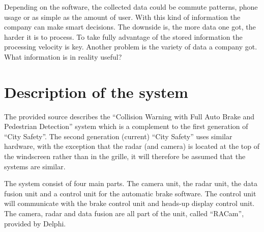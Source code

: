\documentclass[conference]{IEEEtran}
\begin{document}
Depending on the software, the collected data could be commute patterns, phone usage or as simple as the amount of user. With this kind of information the company can make smart decisions. The downside is, the more data one got, the harder it is to process. To take fully advantage of the stored information the processing velocity is key. Another problem is the variety of data a company got. What information is in reality useful? \cite{SpeedDataEco} %


\section{Description of the system}
The provided source describes the ``Collision Warning with Full Auto Brake and Pedestrian Detection'' system which is a complement to the first generation of ``City Safety''. The second generation (current) ``City Safety'' uses similar hardware, with the exception that the radar (and camera) is located at the top of the windscreen rather than in the grille, it will therefore be assumed that the systems are similar. \cite{SysDescription,RACam,DelphiVolvo}

The system consist of four main parts. The camera unit, the radar unit, the data fusion unit and a control unit for the automatic brake software. The control unit will communicate with the brake control unit and heads-up display control unit. The camera, radar and data fusion are all part of the unit, called ``RACam'', provided by Delphi. \cite{SysDescription,DelphiVolvo}
\end{document}
